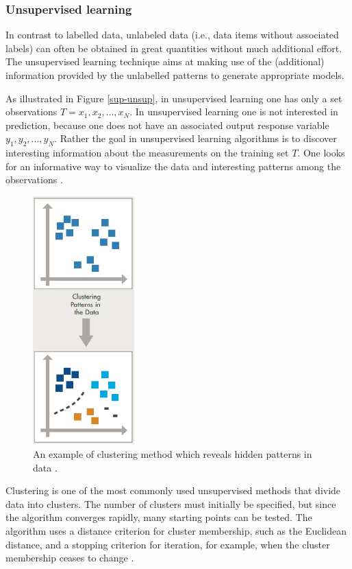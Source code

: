 \subsubsection{Unsupervised learning}

In contrast to labelled data, unlabeled data (i.e., data items without associated labels) can often be obtained in great quantities without much additional effort. The unsupervised learning technique aims at making use of the (additional) information provided by the unlabelled patterns to generate appropriate models. 

As illustrated in Figure \ref{sup-unsup}, in unsupervised learning one has only a set observations $T=x_1,x_2,\dots, x_N$. In unsupervised learning one is not interested in prediction, because one does not have an associated output response variable $y_1,y_2,\dots, y_N$. Rather the goal in unsupervised learning algorithms is to discover interesting information about the measurements on the training set $T$. One looks for an informative way to visualize the data and interesting patterns among the observations \citep{james2013introduction}. 

\begin{figure}[H]
  \centering
    \includegraphics[width=0.35\textwidth]{images/cluster.png}
    \caption{An example of clustering method which reveals hidden patterns in data \citep{Machinelearning}.}
  \label{datagrowth.png}
\end{figure}

Clustering is one of the most commonly used unsupervised methods that divide data into clusters. The number of clusters must initially be specified, but since the algorithm converges rapidly, many starting points can be tested. The algorithm uses a distance
criterion for cluster membership, such as the Euclidean distance, and a stopping criterion for iteration, for example, when the cluster membership ceases to change \citep{ball2010data}.

